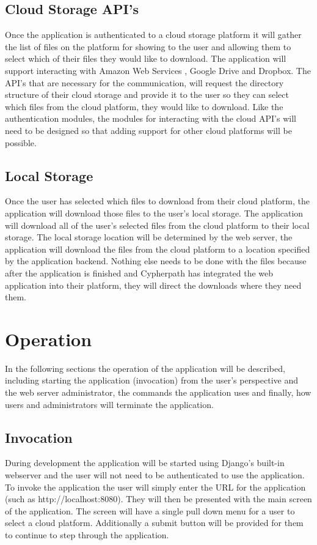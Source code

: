 \documentclass{article}
\begin{document}
        \subsection{Cloud Storage API's}
        Once the application is authenticated to a cloud storage platform it will gather the list of files on the platform for showing to the user and allowing them to select
        which of their files they would like to download. The application will support interacting with Amazon Web Services \cite{aws}, Google Drive and Dropbox. The API's
        that are necessary for the communication, will request the directory structure of their cloud storage and provide it to the user so they can select which files
        from the cloud platform, they would like to download. Like the authentication modules, the modules
        for interacting with the cloud API's will need to be designed so that adding support for other cloud platforms will be possible.


        \subsection{Local Storage}
        Once the user has selected which files to download from their cloud platform, the application will download those
        files to the user's local storage. The application will download all of the user's selected files from the cloud platform to their local storage.
        The local storage location will be determined by the web server, the application will download the files from the cloud platform to a location specified by the application backend. Nothing else 
        needs to be done with the files because after the application is finished and Cypherpath has integrated the web application into 
        their platform, they will direct the downloads where they need them.


    \section{Operation}
    In the following sections the operation of the application will be described, including starting the application
    (invocation) from the user's perspective and the web server administrator, the commands the application uses and finally, how users and administrators will terminate the application.

        \subsection{Invocation}
        During development the application will be started using Django's built-in webserver and
        the user will not need to be authenticated to use the application. To invoke the application the user will simply enter the URL for the application (such as http://localhost:8080).
        They will then be presented with the main screen of the application. The screen will have a single pull down menu for a user to select a cloud platform. Additionally 
        a submit button will be provided for them to continue to step through the application. 
\end{document}
